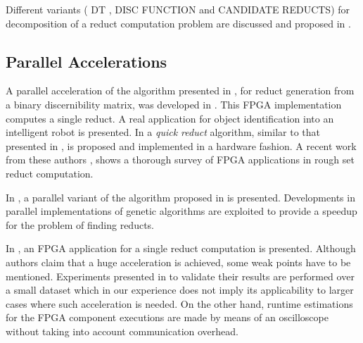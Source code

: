 \documentclass[authoryear,11pt]{elsarticle}
\makeatletter
\newcommand{\setword}[2]{%
  \phantomsection
  #1\def\@currentlabel{\unexpanded{#1}}\label{#2}%
}
\makeatother
\begin{document}
  Different variants (\setword{DT}{DT}, DISC FUNCTION and CANDIDATE REDUCTS) for decomposition of a reduct 
  computation problem are discussed and proposed in \citep{Strakowski08}.

\subsection{Parallel Accelerations}

  A parallel acceleration of the algorithm presented in \citep{Yang08}, for reduct generation from a binary
  discernibility matrix, was developed in \citep{Tiwari11,Tiwari12}. This FPGA implementation computes a 
  single reduct. A real application for object identification into an intelligent robot is presented.
  In \citep{Tiwari13} a \emph{quick reduct} algorithm, similar to that presented in \citep{Chouchoulas01}, 
  is proposed and implemented in a hardware fashion. A recent work from these authors \citep{Tiwari14}, 
  shows a thorough survey of FPGA applications in rough set reduct computation.
	
  In \citep{Wroblewski98}, a parallel variant of the algorithm proposed in \citep{Wroblewski95} is presented.
  Developments in parallel implementations of genetic algorithms are exploited to provide a speedup for the 
  problem of finding reducts.
  
  In \citep{Grzes13,Kopczynski14}, an FPGA application for a single reduct computation is presented. Although
  authors claim that a huge acceleration is achieved, some weak points have to be mentioned. Experiments presented 
  in \citep{Kopczynski14} to validate their results are performed over a small dataset which in our experience 
  does not imply its applicability to larger cases where such acceleration is needed. On the other hand, 
  runtime estimations for the FPGA component executions are made by means of an oscilloscope without taking into 
  account communication overhead.
  
\end{document}
